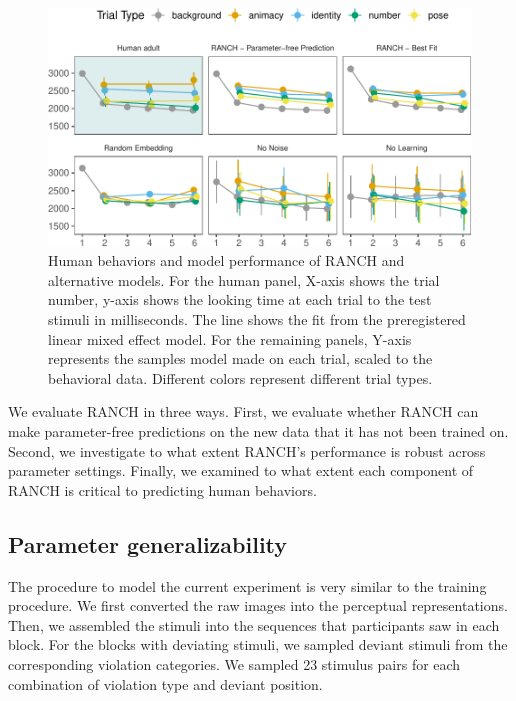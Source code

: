 \documentclass[10pt, letterpaper]{article}
\newenvironment{CodeChunk}{}{}
\begin{document}
\begin{CodeChunk}
\begin{figure}[h!]

{\centering \includegraphics{figs/lol-1} 

}

\caption[Human behaviors and model performance of RANCH and alternative models]{Human behaviors and model performance of RANCH and alternative models. For the human panel, X-axis shows the trial number, y-axis shows the looking time at each trial to the test stimuli in milliseconds. The line shows the fit from the preregistered linear mixed effect model. For the remaining panels, Y-axis represents the samples model made on each trial, scaled to the behavioral data. Different colors represent different trial types.}\label{fig:lol}
\end{figure}
\end{CodeChunk}

We evaluate RANCH in three ways. First, we evaluate whether RANCH can
make parameter-free predictions on the new data that it has not been
trained on. Second, we investigate to what extent RANCH's performance is
robust across parameter settings. Finally, we examined to what extent
each component of RANCH is critical to predicting human behaviors.

\hypertarget{parameter-generalizability}{%
\subsection{Parameter
generalizability}\label{parameter-generalizability}}

The procedure to model the current experiment is very similar to the
training procedure. We first converted the raw images into the
perceptual representations. Then, we assembled the stimuli into the
sequences that participants saw in each block. For the blocks with
deviating stimuli, we sampled deviant stimuli from the corresponding
violation categories. We sampled 23 stimulus pairs for each combination
of violation type and deviant position.
\end{document}
